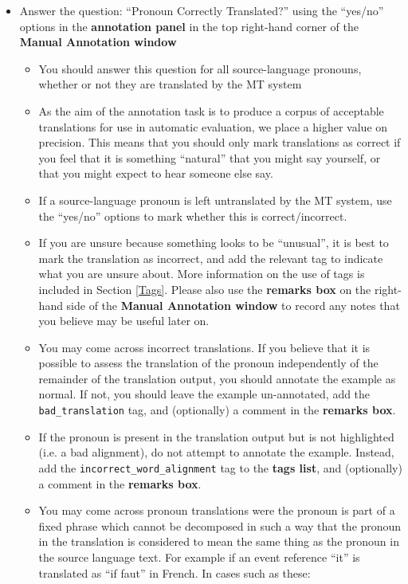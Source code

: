 \documentclass[11pt]{article} %
\newcommand\tag[1]{\texttt{#1}}
\begin{document}
\begin{itemize}
  \item Answer the question: ``Pronoun Correctly Translated?'' using the ``yes/no'' options in the \textbf{annotation panel} in the top right-hand corner of the \textbf{Manual Annotation window}
  \begin{itemize}
    \item You should answer this question for all source-language pronouns, whether or not they are translated by the MT system
    \item As the aim of the annotation task is to produce a corpus of acceptable translations for use in automatic evaluation, we place a higher value on precision. This means that you should only mark translations as correct if you feel that it is something ``natural'' that you might say yourself, or that you might expect to hear someone else say.
    \item If a source-language pronoun is left untranslated by the MT system, use the ``yes/no'' options to mark whether this is correct/incorrect.
    \item If you are unsure because something looks to be ``unusual'', it is best to mark the translation as incorrect, and add the relevant tag to indicate what you are unsure about. More information on the use of tags is included in Section \ref{Tags}. Please also use the \textbf{remarks box} on the right-hand side of the \textbf{Manual Annotation window} to record any notes that you believe may be useful later on.
    \item You may come across incorrect translations. If you believe that it is possible to assess the translation of the pronoun independently of the remainder of the translation output, you should annotate the example as normal. If not, you should leave the example un-annotated, add the \tag{bad\_translation} tag, and (optionally) a comment in the \textbf{remarks box}.
    \item If the pronoun is present in the translation output but is not highlighted (i.e. a bad alignment), do not attempt to annotate the example. Instead, add the \tag{incorrect\_word\_alignment} tag to the \textbf{tags list}, and (optionally) a comment in the \textbf{remarks box}.
    \item You may come across pronoun translations were the pronoun is part of a fixed phrase which cannot be decomposed in such a way that the pronoun in the translation is considered to mean the same thing as the pronoun in the source language text. For example if an event reference ``it'' is translated as ``if faut'' in French. In cases such as these:

\end{itemize}
\end{itemize}
\end{document}
